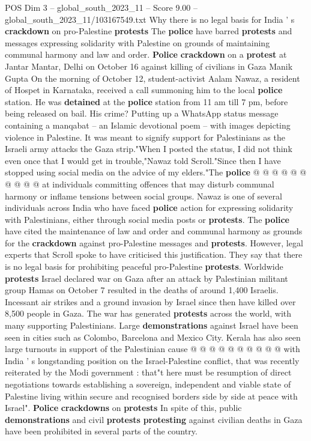 \begin{textsample}{POS Dim 3 – global\_south\_2023\_11 – Score 9.00 – global\_south\_2023\_11/103167549.txt}  \label{ex:f3_pos_376}
Why there is no legal basis for India ' s \textbf{crackdown} on pro-Palestine \textbf{protests} The \textbf{police} have barred \textbf{protests} and messages expressing solidarity with Palestine on grounds of maintaining communal harmony and law and order. \textbf{Police} \textbf{crackdown} on a \textbf{protest} at Jantar Mantar, Delhi on October 16 against killing of civilians in Gaza Manik Gupta On the morning of October 12, student-activist Aalam Nawaz, a resident of Hospet in Karnataka, received a call summoning him to the local \textbf{police} station.
He was \textbf{detained} at the \textbf{police} station from 11 am till 7 pm, before being released on bail.
His crime?
Putting up a WhatsApp status message containing a manqabat -- an Islamic devotional poem -- with images depicting violence in Palestine.
It was meant to signify support for Palestinians as the Israeli army attacks the Gaza strip."When I posted the status, I did not think even once that I would get in trouble,"Nawaz told Scroll."Since then I have stopped using social media on the advice of my elders."The \textbf{police} @ @ @ @ @ @ @ @ @ @ at individuals committing offences that may disturb communal harmony or inflame tensions between social groups.
Nawaz is one of several individuals across India who have faced \textbf{police} action for expressing solidarity with Palestinians, either through social media posts or \textbf{protests}.
The \textbf{police} have cited the maintenance of law and order and communal harmony as grounds for the \textbf{crackdown} against pro-Palestine messages and \textbf{protests}.
However, legal experts that Scroll spoke to have criticised this justification.
They say that there is no legal basis for prohibiting peaceful pro-Palestine \textbf{protests}.
Worldwide \textbf{protests} Israel declared war on Gaza after an attack by Palestinian militant group Hamas on October 7 resulted in the deaths of around 1,400 Israelis.
Incessant air strikes and a ground invasion by Israel since then have killed over 8,500 people in Gaza.
The war has generated \textbf{protests} across the world, with many supporting Palestinians.
Large \textbf{demonstrations} against Israel have been seen in cities such as Colombo, Barcelona and Mexico City.
Kerala has also seen large turnouts in support of the Palestinian cause @ @ @ @ @ @ @ @ @ @ with India ' s longstanding position on the Israel-Palestine conflict, that was recently reiterated by the Modi government : that"t here must be resumption of direct negotiations towards establishing a sovereign, independent and viable state of Palestine living within secure and recognised borders side by side at peace with Israel". \textbf{Police} \textbf{crackdowns} on \textbf{protests} In spite of this, public \textbf{demonstrations} and civil \textbf{protests} \textbf{protesting} against civilian deaths in Gaza have been prohibited in several parts of the country.

\end{textsample}
